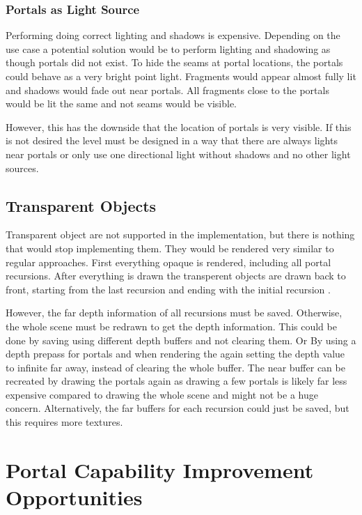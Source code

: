 \subsubsection{Portals as Light Source}
\label{section:portalsaslights}
Performing doing correct lighting and shadows is expensive. Depending on the use case a potential solution would be to perform lighting and shadowing as though portals did not exist. To hide the seams at portal locations, the portals could behave as a very bright point light. Fragments would appear almost fully lit and shadows would fade out near portals. All fragments close to the portals would be lit the same and not seams would be visible.

However, this has the downside that the location of portals is very visible. If this is not desired the level must be designed in a way that there are always lights near portals or only use one directional light without shadows and no other light sources.


\subsection{Transparent Objects}
Transparent object are not supported in the implementation, but there is nothing that would stop implementing them. They would be rendered very similar to regular approaches. First everything opaque is rendered, including all portal recursions. After everything is drawn the transperent objects are drawn back to front, starting from the last recursion and ending with the initial recursion \cite{lecture:portalProblems}.

However, the far depth information of all recursions must be saved. Otherwise, the whole scene must be redrawn to get the depth information. This could be done by saving using different depth buffers and not clearing them. Or By using a depth prepass for portals and when rendering the again setting the depth value to infinite far away, instead of clearing the whole buffer. The near buffer can be recreated by drawing the portals again as drawing a few portals is likely far less expensive compared to drawing the whole scene and might not be a huge concern. Alternatively, the far buffers for each recursion could just be saved, but this requires more textures.


\section{Portal Capability Improvement Opportunities}



